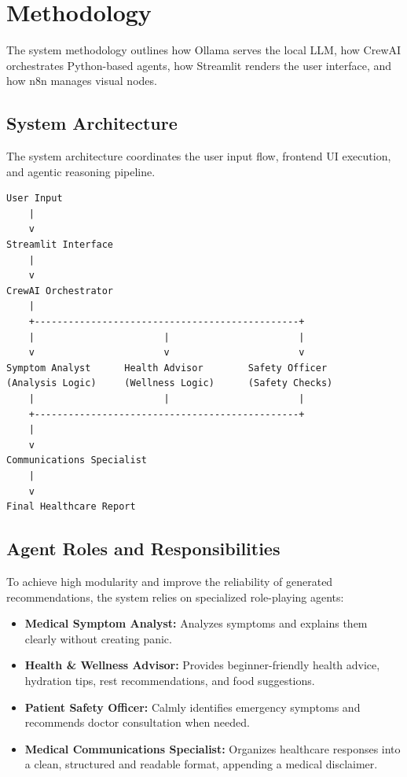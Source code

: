 \documentclass[12pt,a4paper]{report}
\begin{document}
\chapter{Methodology}
The system methodology outlines how Ollama serves the local LLM, how CrewAI orchestrates Python-based agents, how Streamlit renders the user interface, and how n8n manages visual nodes.

\section{System Architecture}
The system architecture coordinates the user input flow, frontend UI execution, and agentic reasoning pipeline. 

\begin{verbatim}
User Input
    |
    v
Streamlit Interface
    |
    v
CrewAI Orchestrator
    |
    +-----------------------------------------------+
    |                       |                       |
    v                       v                       v
Symptom Analyst      Health Advisor        Safety Officer
(Analysis Logic)     (Wellness Logic)      (Safety Checks)
    |                       |                       |
    +-----------------------------------------------+
    |
    v
Communications Specialist
    |
    v
Final Healthcare Report
\end{verbatim}

\section{Agent Roles and Responsibilities}
To achieve high modularity and improve the reliability of generated recommendations, the system relies on specialized role-playing agents:
\begin{itemize}
    \item \textbf{Medical Symptom Analyst:} Analyzes symptoms and explains them clearly without creating panic.
    \item \textbf{Health \& Wellness Advisor:} Provides beginner-friendly health advice, hydration tips, rest recommendations, and food suggestions.
    \item \textbf{Patient Safety Officer:} Calmly identifies emergency symptoms and recommends doctor consultation when needed.
    \item \textbf{Medical Communications Specialist:} Organizes healthcare responses into a clean, structured and readable format, appending a medical disclaimer.
\end{itemize}
\end{document}
